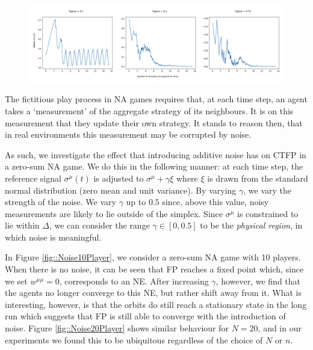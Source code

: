 \documentclass{article}
\theoremstyle{definition}
\newcommand{\refmu}{\sigma^{\mu}}
\begin{document}
  \begin{figure}[t]
    \centering
    \includegraphics[width = \columnwidth]{Figures/3PlayerChainNoise.png}
    \caption{\label{fig::3PlayerChainNoise}}
  \end{figure}

  The fictitious play process in NA games requires that, at each time step, an agent takes a
  `measurement' of the aggregate strategy of its neighbours. It is on this measurement that they
  update their own strategy. It stands to reason then, that in real environments this measurement
  may be corrupted by noise. 
  
  As such, we investigate the effect that introducing additive noise has
  on CTFP in a zero-sum NA game. We do this in the following manner: at each time step, the
  reference signal $\refmu(t)$ is adjusted to $\refmu + \gamma \xi$ where $\xi$ is drawn from the
  standard normal distribution (zero mean and unit variance). By varying $\gamma$, we vary the
  strength of the noise. We vary $\gamma$ up to $0.5$ since, above this value, noisy measurements
  are likely to lie outside of the simplex. Since $\refmu$ is constrained to lie within $\Delta$, we
  can consider the range $\gamma \in [0, 0.5]$ to be the \emph{physical region}, in which noise is meaningful.

  In Figure \ref{fig::Noise10Player}, we consider a zero-sum NA game with 10 players. When there is
  no noise, it can be seen that FP reaches a fixed point which, since we set $w^{\mu \mu} = 0$,
  corresponds to an NE. After increasing $\gamma$, however, we find that the agents no longer
  converge to this NE, but rather shift away from it. What is interesting, however, is that the
  orbits do still reach a stationary state in the long run which suggests that FP is still able to
  converge with the introduction of noise. Figure \ref{fig::Noise20Player} shows similar behaviour
  for $N = 20$, and in our experiments we found this to be ubiquitous regardless of the choice of
  $N$ or $n$. 
\end{document}
